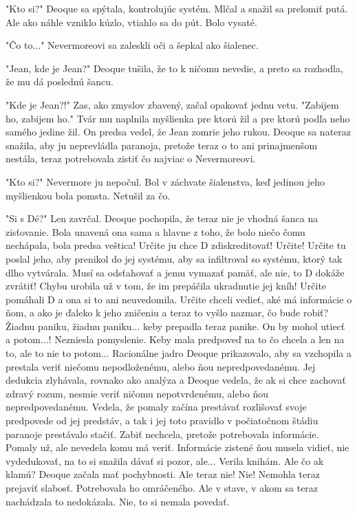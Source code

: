 \documentclass{book}
\begin{document}
"$ $Kto si?"$ $ Deoque sa spýtala, kontrolujúc systém. Mlčal a snažil sa prelomiť putá. Ale ako náhle vzniklo kúzlo, vtiahlo sa do pút. Bolo vysaté.

"$ $Čo to..."$ $ Nevermoreovi sa zaleskli oči a šepkal ako šialenec.

"$ $Jean, kde je Jean?"$ $ Deoque tušila, že to k ničomu nevedie, a preto sa rozhodla, že mu dá poslednú šancu.

"$ $Kde je Jean?!"$ $ Zas, ako zmyslov zbavený, začal opakovať jednu vetu. "$ $Zabijem ho, zabijem ho."$ $ Tvár mu naplnila myšlienka pre ktorú žil a pre ktorú podľa neho samého jedine žil. On predsa vedel, že Jean zomrie jeho rukou. Deoque sa nateraz snažila, aby ju neprevládla paranoja, pretože teraz o to ani prinajmenšom nestála, teraz potrebovala zistiť čo najviac o Nevermoreovi.

"$ $Kto si?"$ $ Nevermore ju nepočul. Bol v záchvate šialenstva, keď jedinou jeho myšlienkou bola pomsta. Netušil za čo.

"$ $Si s Dé?"$ $ Len zavrčal. Deoque pochopila, že teraz nie je vhodná šanca na zisťovanie. Bola unavená ona sama a hlavne z toho, že bolo niečo čomu nechápala, bola predsa veštica! Určite ju chce D zdiskreditovať! Určite! Určite tu poslal jeho, aby prenikol do jej systému, aby sa infiltroval so systému, ktorý tak dlho vytvárala. Musí sa odsťahovať a jemu vymazať pamäť, ale nie, to D dokáže zvrátiť! Chybu urobila už v tom, že im prepáčila ukradnutie jej kníh! Určite pomáhali D a ona si to ani neuvedomila. Určite chceli vedieť, aké má informácie o ňom, a ako je ďaleko k jeho zničeniu a teraz to vyšlo nazmar, čo bude robiť? Žiadnu paniku, žiadnu paniku... keby prepadla teraz panike. On by mohol utiecť a potom...! Nezniesla pomyslenie. Keby mala predpoveď na to čo chcela a len na to, ale to nie to potom... Racionálne jadro Deoque prikazovalo, aby sa vzchopila a prestala veriť niečomu nepodloženému, alebo ňou nepredpovedanému. Jej dedukcia zlyhávala, rovnako ako analýza a Deoque vedela, že ak si chce zachovať zdravý rozum, nesmie veriť ničomu nepotvrdenému, alebo ňou nepredpovedanému. Vedela, že pomaly začína prestávať rozlišovať svoje predpovede od jej predstáv, a tak i jej toto pravidlo v počiatočnom štádiu paranoje prestávalo stačiť. Zabiť nechcela, pretože potrebovala informácie. Pomaly už, ale nevedela komu má veriť. Informácie zistené ňou musela vidieť, nie vydedukovať, na to si snažila dávať si pozor, ale... Verila knihám. Ale čo ak klamú? Deoque začala mať pochybnosti. Ale teraz nie! Nie! Nemohla teraz prejaviť slabosť. Potrebovala ho omráčeného. Ale v stave, v akom sa teraz nachádzala to nedokázala. Nie, to si nemala povedať.
\end{document}
